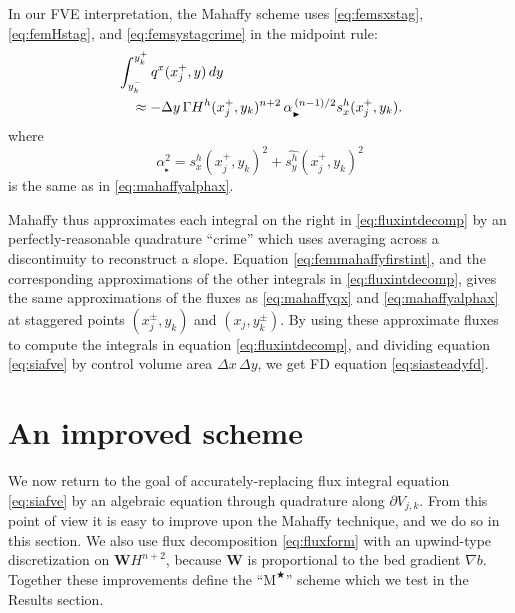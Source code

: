\documentclass[twocolumn,letterpaper]{igs}
\newcommand\bW{\mathbf{W}}
\newcommand{\grad}{\nabla}
\newcommand{\Mstar}{$\text{M}^{\bigstar}$\xspace}
\newcommand\alpharight{\alpha_{{}_{\blacktriangleright}}}
\begin{document}
In our FVE interpretation, the Mahaffy scheme uses \eqref{eq:femsxstag}, \eqref{eq:femHstag}, and \eqref{eq:femsystagcrime} in the midpoint rule:
\begin{align}
&\int_{y_k^-}^{y_k^+} q^x(x_j^+,y)\,dy  \label{eq:femmahaffyfirstint} \\
  &\quad\approx - \Delta y\, \Gamma H^h(x_j^+,y_k)^{n+2} \,\alpharight^{\,(n-1)/2} s^h_x(x_j^+,y_k). \notag 
\end{align}
where
\begin{equation}
\alpharight^2 = s^h_x(x_j^+,y_k)^2 + \widehat{s^h_y}(x_j^+,y_k)^2
\end{equation}
is the same as in \eqref{eq:mahaffyalphax}.

Mahaffy thus approximates each integral on the right in \eqref{eq:fluxintdecomp} by an perfectly-reasonable quadrature ``crime'' \citep[compare][]{Strang1972} which uses averaging across a discontinuity to reconstruct a slope.  Equation \eqref{eq:femmahaffyfirstint}, and the corresponding approximations of the other integrals in \eqref{eq:fluxintdecomp}, gives the same approximations of the fluxes as \eqref{eq:mahaffyqx} and \eqref{eq:mahaffyalphax} at staggered points $(x_j^\pm,y_k)$ and $(x_j,y_k^\pm)$.  By using these approximate fluxes to compute the integrals in equation \eqref{eq:fluxintdecomp}, and dividing equation \eqref{eq:siafve} by control volume area $\Delta x\,\Delta y$, we get FD equation \eqref{eq:siasteadyfd}.


\section{An improved scheme}  \label{sec:star}

We now return to the goal of accurately-replacing flux integral equation \eqref{eq:siafve} by an algebraic equation through quadrature along $\partial V_{j,k}$.  From this point of view it is easy to improve upon the Mahaffy technique, and we do so in this section.  We also use flux decomposition \eqref{eq:fluxform} with an upwind-type discretization on $\bW H^{n+2}$, because $\bW$ is proportional to the bed gradient $\grad b$.  Together these improvements define the ``\Mstar'' scheme which we test in the Results section.
\end{document}
